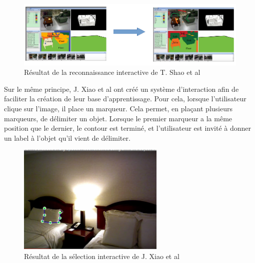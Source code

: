 \begin{figure}[!ht]
  \begin{center}
    \includegraphics[width=16cm]{image/recoInteractive1.png}
    \caption{Résultat de la reconnaissance interactive de T. Shao et al\cite{interactiveSeg}}
  \end{center}
\end{figure}

Sur le même principe, J. Xiao et al\cite{interactionSeg2}
ont créé un système d'interaction afin de faciliter la création de leur base d'apprentissage. Pour cela, lorsque l'utilisateur 
clique sur l'image, il place un marqueur. Cela permet, en plaçant plusieurs marqueurs, de délimiter un objet. Lorsque le premier
marqueur a la même position que le dernier, le contour est terminé, et l'utilisateur est invité à donner un label à l'objet
qu'il vient de délimiter.

\begin{figure}[!ht]
  \begin{center}
    \includegraphics[width=7cm]{image/segInteractive1.png}
    \caption{Résultat de la sélection interactive de J. Xiao et al\cite{interactionSeg2}}
  \end{center}
\end{figure}
